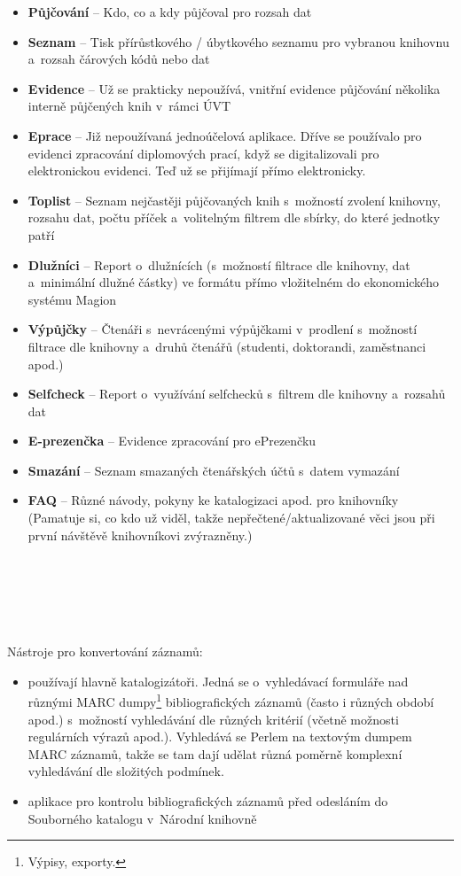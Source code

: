 \documentclass[
	11pt, oneside, printed, final, palatino, monochrome
	microtype,
	table,   %
	lof,     %
	lot     %
]{fithesis3}
\newcommand{\bold}[1]{\textbf{#1}}
\begin{document}
{\begin{itemize}
\item \bold{Půjčování} – Kdo, co a kdy půjčoval pro rozsah dat
\item \bold{Seznam} – Tisk přírůstkového / úbytkového seznamu pro vybranou knihovnu a~rozsah čárových kódů nebo dat
\item \bold{Evidence} – Už se prakticky nepoužívá, vnitřní evidence půjčování několika interně půjčených knih v~rámci ÚVT
\item \bold{Eprace} – Již nepoužívaná jednoúčelová aplikace. Dříve se používalo pro evidenci zpracování diplomových prací, když se digitalizovali pro elektronickou evidenci. Teď už se přijímají přímo elektronicky.
\item \bold{Toplist} – Seznam nejčastěji půjčovaných knih s~možností zvolení knihovny, rozsahu dat, počtu příček a~volitelným filtrem dle sbírky, do které jednotky patří
\item \bold{Dlužníci} – Report o~dlužnících (s~možností filtrace dle knihovny, dat a~minimální dlužné částky) ve formátu přímo vložitelném do ekonomického systému Magion
\item \bold{Výpůjčky} – Čtenáři s~nevrácenými výpůjčkami v~prodlení s~možností filtrace dle knihovny a~druhů čtenářů (studenti, doktorandi, zaměstnanci apod.)
\item \bold{Selfcheck} – Report o~využívání selfchecků s~filtrem dle knihovny a~rozsahů dat
\item \bold{E-prezenčka} – Evidence zpracování pro ePrezenčku
\item \bold{Smazání} – Seznam smazaných čtenářských účtů s~datem vymazání
\item \bold{FAQ} – Různé návody, pokyny ke katalogizaci apod. pro knihovníky (Pamatuje si, co kdo už viděl, takže nepřečtené/aktualizované věci jsou při první návštěvě knihovníkovi zvýrazněny.)
\end{itemize}
~\\~\\~\\~\\~\\%
Nástroje pro konvertování záznamů:

\begin{itemize}
\item používají hlavně katalogizátoři. Jedná se o~vyhledávací formuláře nad různými MARC dumpy\footnote{Výpisy, exporty.} bibliografických záznamů (často i různých období apod.) s~možností vyhledávání dle různých kritérií (včetně možnosti regulárních výrazů apod.). Vyhledává se Perlem na textovým dumpem MARC záznamů, takže se tam dají udělat různá poměrně komplexní vyhledávání dle složitých podmínek. 
\item aplikace pro kontrolu bibliografických záznamů před odesláním do Souborného katalogu v~Národní knihovně
\end{itemize}

}
\end{document}
